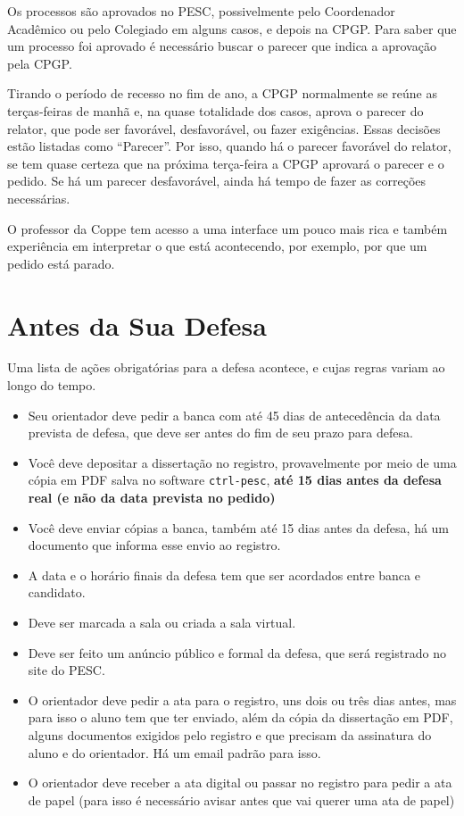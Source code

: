 Os processos são aprovados no PESC, possivelmente pelo Coordenador Acadêmico ou pelo Colegiado em alguns casos, e depois na CPGP. Para saber que um processo foi aprovado é necessário buscar o parecer que indica a aprovação pela CPGP. 

Tirando o período de recesso no fim de ano, a CPGP normalmente se reúne as terças-feiras de manhã e, na quase totalidade dos casos, aprova o parecer do relator, que pode ser favorável, desfavorável, ou fazer exigências. Essas decisões estão listadas como ``Parecer''. Por isso, quando há o parecer favorável do relator, se tem quase certeza que na próxima terça-feira a CPGP aprovará o parecer e o pedido. Se há um parecer desfavorável, ainda há tempo de fazer as correções necessárias.

O professor da Coppe tem acesso a uma interface um pouco mais rica e também experiência em interpretar o que está acontecendo, por exemplo, por que um pedido está parado.


\section{Antes da Sua Defesa}

Uma lista de ações obrigatórias para a defesa acontece, e cujas regras variam ao longo do tempo.

\begin{itemize}
    \item Seu orientador deve pedir a banca com até 45 dias de antecedência da data prevista de defesa, que deve ser antes do fim de seu prazo para defesa. 
    \item Você deve depositar a dissertação no registro, provavelmente por meio de uma cópia em PDF salva no software \verb|ctrl-pesc|, \textbf{até 15 dias antes da defesa real (e não da data prevista no pedido)}
    \item Você deve enviar cópias a banca, também até 15 dias antes da defesa, há um documento que informa esse envio ao registro.
    \item A data e o horário finais da defesa tem que ser acordados entre banca e candidato.
    \item Deve ser marcada a sala ou criada a sala virtual.
    \item Deve ser feito um anúncio público e formal da defesa, que será registrado no site do PESC.
    \item O orientador deve pedir a ata para o registro, uns dois ou três dias antes, mas para isso o aluno tem que ter enviado, além da cópia da dissertação em PDF, alguns documentos exigidos pelo registro e que precisam da assinatura do aluno e do orientador. Há um email padrão para isso.
    \item O orientador deve receber a ata digital ou passar no registro para pedir a ata de papel (para isso é necessário avisar antes que vai querer uma ata de papel)
\end{itemize}


